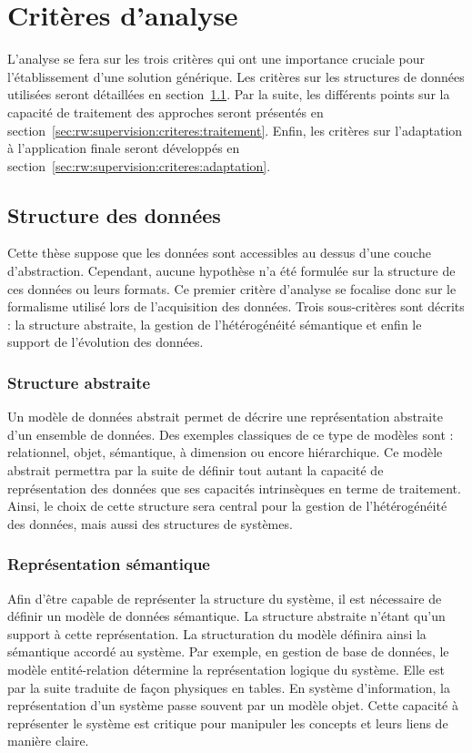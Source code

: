 \section{Critères d'analyse}\label{sec:rw:supervision:criteres}
L'analyse se fera sur les trois critères qui ont une importance cruciale pour l'établissement d'une solution générique. Les critères sur les structures de données utilisées seront détaillées en section~\ref{sec:rw:supervision:criteres:structure}. Par la suite, les différents points sur la capacité de traitement des approches seront présentés en section~\ref{sec:rw:supervision:criteres:traitement}. Enfin, les critères sur l'adaptation à l'application finale seront développés en section~\ref{sec:rw:supervision:criteres:adaptation}.

\subsection{Structure des données}\label{sec:rw:supervision:criteres:structure}
Cette thèse suppose que les données sont accessibles au dessus d'une couche d'abstraction. Cependant, aucune hypothèse n'a été formulée sur la structure de ces données ou leurs formats. Ce premier critère d'analyse se focalise donc sur le formalisme utilisé lors de l'acquisition des données. Trois sous-critères sont décrits : la structure abstraite, la gestion de l'hétérogénéité sémantique et enfin le support de l'évolution des données.

\subsubsection{Structure abstraite}
Un modèle de données abstrait permet de décrire une représentation abstraite d'un ensemble de données. Des exemples classiques de ce type de modèles sont : relationnel, objet, sémantique, à dimension ou encore hiérarchique. Ce modèle abstrait permettra par la suite de définir tout autant la capacité de représentation des données que ses capacités intrinsèques en terme de traitement. Ainsi, le choix de cette structure sera central pour la gestion de l'hétérogénéité des données, mais aussi des structures de systèmes.

\subsubsection{Représentation sémantique}
Afin d'être capable de représenter la structure du système, il est nécessaire de définir un modèle de données sémantique. La structure abstraite n'étant qu'un support à cette représentation. La structuration du modèle définira ainsi la sémantique accordé au système. Par exemple, en gestion de base de données, le modèle entité-relation détermine la représentation logique du système. Elle est par la suite traduite de façon physiques en tables. En système d'information, la représentation d'un système passe souvent par un modèle objet. Cette capacité à représenter le système est critique pour manipuler les concepts et leurs liens de manière claire.

